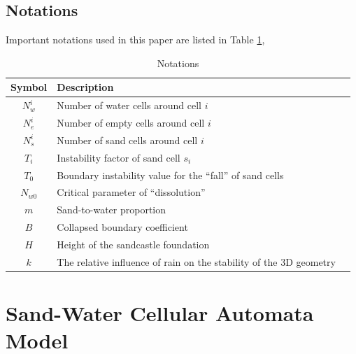 \documentclass{mcmthesis}		    %
\begin{document}
	\subsection{Notations}
	Important notations used in this paper are listed in Table \ref{Notations},

	\begin{table}[htbp!]
        \setlength{\belowcaptionskip}{0.2cm}
		\centering
		\caption{Notations}
		\label{Notations}
		\begin{tabular}{clc}
		\hline
			Symbol   & Description     \\ \hline
			$N_{w}^{i}$    & Number of water cells around cell $i$ \\
			$N_{e}^{i}$    & Number of empty cells around cell $i$ \\
			$N_{s}^{i}$    & Number of sand cells around cell $i$ \\
			$T_i$            & Instability factor of sand cell $s_i$ \\
	     	$T_0$            &Boundary instability value for the “fall” of sand cells\\
			$N_{w0}$     & Critical parameter of “dissolution”  \\
			$m$            & Sand-to-water proportion \\
	     	$B$            &Collapsed boundary coefficient\\
	     	$H$         & Height of the sandcastle foundation\\
	     	$k$         & The relative influence of rain on the stability of the 3D geometry
	     	\\ \hline
		\end{tabular}
	\end{table}
	

	\section{Sand-Water Cellular Automata Model}\label{sec:CA}
\end{document}
